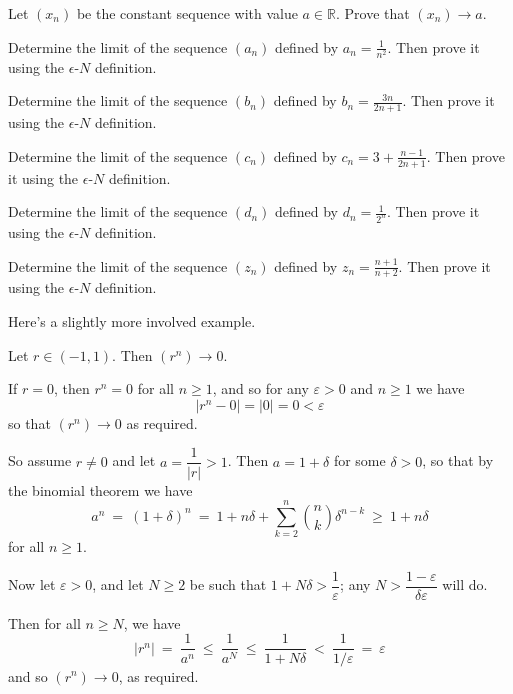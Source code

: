 \begin{exercise}
Let $(x_n)$ be the constant sequence with value $a \in \mathbb{R}$. Prove that $(x_n) \to a$.
\end{exercise}

\begin{exercise}
Determine the limit of the sequence $(a_n)$ defined by $a_n=\frac{1}{n^2}$. Then prove it using the $\epsilon$-$N$ definition.
\end{exercise}

\begin{exercise}
Determine the limit of the sequence $(b_n)$ defined by $b_n=\frac{3n}{2n+1}$. Then prove it using the $\epsilon$-$N$ definition.
\end{exercise}

\begin{exercise}
Determine the limit of the sequence $(c_n)$ defined by $c_n=3+\frac{n-1}{2n+1}$. Then prove it using the $\epsilon$-$N$ definition.
\end{exercise}

\begin{exercise}
Determine the limit of the sequence $(d_n)$ defined by $d_n=\frac{1}{2^n}$. Then prove it using the $\epsilon$-$N$ definition.
\end{exercise}

\begin{exercise}
Determine the limit of the sequence $(z_n)$ defined by $z_n=\frac{n+1}{n+2}$. Then prove it using the $\epsilon$-$N$ definition.
\end{exercise}

Here's a slightly more involved example.

\begin{proposition}
\label{propPowerOfRTendsToZero}
Let $r \in (-1, 1)$. Then $(r^n) \to 0$.
\end{proposition}

\begin{cproof}
If $r=0$, then $r^n = 0$ for all $n \ge 1$, and so for any $\varepsilon > 0$ and $n \ge 1$ we have
\[ |r^n - 0| = |0| = 0 < \varepsilon \]
so that $(r^n) \to 0$ as required.

So assume $r \ne 0$ and let $a = \dfrac{1}{|r|} > 1$. Then $a = 1 + \delta$ for some $\delta > 0$, so that by the binomial theorem we have
\[ a^n ~=~ (1+\delta)^n ~=~ 1+n\delta + \sum_{k=2}^n \binom{n}{k} \delta^{n-k} ~\ge~ 1+n\delta \]
for all $n \ge 1$.

Now let $\varepsilon > 0$, and let $N \ge 2$ be such that $1+N\delta > \dfrac{1}{\varepsilon}$; any $N > \dfrac{1-\varepsilon}{\delta \varepsilon}$ will do.

Then for all $n \ge N$, we have
\[ |r^n| ~=~ \frac{1}{a^n} ~\le~ \frac{1}{a^N} ~\le~ \frac{1}{1+N\delta} ~<~ \frac{1}{1/\varepsilon} ~=~ \varepsilon \]
and so $(r^n) \to 0$, as required.
\end{cproof}


